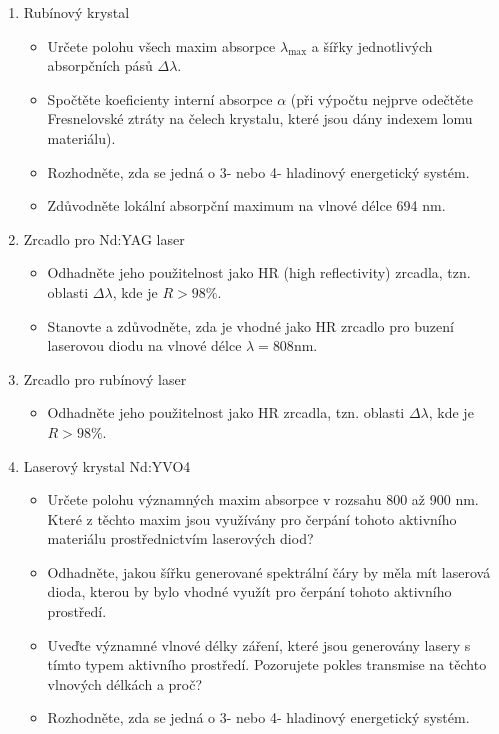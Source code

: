 \begin{enumerate}
\begin{enumerate}
	\item Rubínový krystal
		\begin{itemize}
		\item Určete polohu všech maxim absorpce $\lambda_{\mathrm{max}}$ a šířky jednotlivých absorpčních pásů $\Delta\lambda$.
		\item Spočtěte koeficienty interní absorpce $\alpha$ (při výpočtu nejprve odečtěte Fresnelovské ztráty na čelech krystalu, které jsou dány indexem lomu materiálu).
		\item Rozhodněte, zda se jedná o 3- nebo 4- hladinový energetický systém.
		\item Zdůvodněte lokální absorpční maximum na vlnové délce 694 nm.
		\end{itemize}
		
	\item Zrcadlo pro Nd:YAG laser
		\begin{itemize}
		\item Odhadněte jeho použitelnost jako HR (high reflectivity) zrcadla, tzn. oblasti $\Delta\lambda$, kde je $R > 98 \%$.
		\item Stanovte a zdůvodněte, zda je vhodné jako HR zrcadlo pro buzení laserovou diodu na vlnové délce $\lambda = 808 \mathrm{nm}$.
		\end{itemize}
		
	\item Zrcadlo pro rubínový laser
		\begin{itemize}
		\item Odhadněte jeho použitelnost jako HR zrcadla, tzn. oblasti $\Delta\lambda$, kde je $R > 98 \%$.
		\end{itemize}
		
	\item Laserový krystal Nd:YVO4
		\begin{itemize}
		\item Určete polohu významných maxim absorpce v rozsahu 800 až 900 nm. Které z těchto maxim jsou využívány pro čerpání tohoto aktivního materiálu prostřednictvím laserových diod?
		\item Odhadněte, jakou šířku generované spektrální čáry by měla mít laserová dioda, kterou by bylo vhodné využít pro čerpání tohoto aktivního prostředí.
		\item Uveďte významné vlnové délky záření, které jsou generovány lasery s tímto typem aktivního prostředí. Pozorujete pokles transmise na těchto vlnových délkách a proč?
		\item Rozhodněte, zda se jedná o 3- nebo 4- hladinový energetický systém.
		\end{itemize}
		

\end{enumerate}
\end{enumerate}
